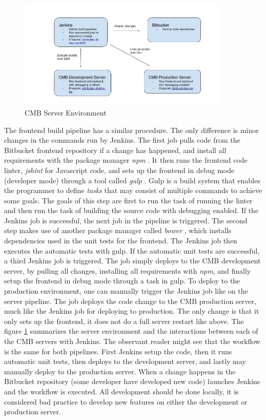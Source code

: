 \begin{figure}
  \includegraphics[width=0.9\textwidth, height=0.5\textwidth]{figs/server_env.jpg}
  \caption[CMB Server Environment]{CMB Server Environment}
  \label{fig:cmb-server}
\end{figure}

The frontend build pipeline has a similar procedure. The only difference is minor changes in the commands run by Jenkins. The first job pulls code from the Bitbucket frontend repository if a change has happened, and install all requirements with the package manager \textit{npm} \cite{m:npm}. It then runs the frontend code linter, \textit{jshint} \cite{m:jshint} for Javascript code, and sets up the frontend in debug mode (developer mode) through a tool called \textit{gulp} \cite{m:gulp}. Gulp is a build system that enables the programmer to define \textit{tasks} that may consist of multiple commands to achieve some goals. The goals of this step are first to run the task of running the linter and then run the task of building the source code with debugging enabled. If the Jenkins job is successful, the next job in the pipeline is triggered. The second step makes use of another package manager called \textit{bower} \cite{m:bower}, which installs dependencies used in the unit tests for the frontend. The Jenkins job then executes the automatic tests with gulp. If the automatic unit tests are successful, a third Jenkins job is triggered. The job simply deploys to the CMB development server, by pulling all changes, installing all requirements with \textit{npm}, and finally setup the frontend in debug mode through a task in gulp. To deploy to the production environment, one can manually trigger the Jenkins job like on the server pipeline. The job deploys the code change to the CMB production server, much like the Jenkins job for deploying to production. The only change is that it only sets up the frontend, it does not do a full server restart like above. The figure \ref{fig:cmb-server} summarizes the server environment and the interactions between each of the CMB servers with Jenkins. The observant reader might see that the workflow is the same for both pipelines. First Jenkins setup the code, then it runs automatic unit tests, then deploys to the development server, and lastly may manually deploy to the production server. When a change happens in the Bitbucket repository (some developer have developed new code) launches Jenkins and the workflow is executed. All development should be done locally, it is considered bad practice to develop new features on either the development or production server.

